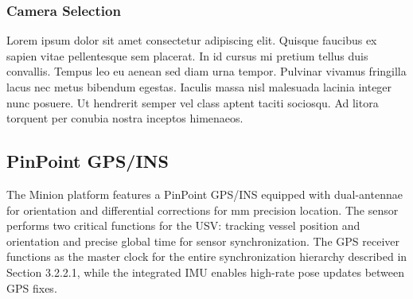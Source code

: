 \documentclass{erauthesis}
\begin{document}

\subsubsection{Camera Selection} \label{camera_selection}

Lorem ipsum dolor sit amet consectetur adipiscing elit. Quisque faucibus ex sapien vitae pellentesque sem placerat. In id cursus mi pretium tellus duis convallis. Tempus leo eu aenean sed diam urna tempor. Pulvinar vivamus fringilla lacus nec metus bibendum egestas. Iaculis massa nisl malesuada lacinia integer nunc posuere. Ut hendrerit semper vel class aptent taciti sociosqu. Ad litora torquent per conubia nostra inceptos himenaeos.





\subsection{PinPoint GPS/INS} \label{sensors_GPS}

The Minion platform features a PinPoint \ac{GPS}/\ac{INS} equipped with dual-antennae for orientation and differential corrections for mm precision location.
The sensor performs two critical functions for the \ac{USV}: tracking vessel position and orientation and precise global time for sensor synchronization.
The \ac{GPS} receiver functions as the master clock for the entire synchronization hierarchy described in Section 3.2.2.1, while the integrated \ac{IMU} enables high-rate pose updates between \ac{GPS} fixes.

\end{document}
